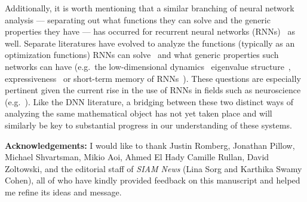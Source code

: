 \documentclass[11pt,lettersize]{article}
\begin{document}
Additionally, it is worth mentioning that a similar branching of neural network analysis --- separating out what functions they can solve and the generic properties they have --- has occurred for recurrent neural networks (RNNs)~\cite{hopfield1982neural} as well. Separate literatures have evolved to analyze the functions (typically as an optimization functions) RNNs can solve~\cite{rozell2008sparse,hu2012network,charles2012common} and what generic properties such networks can have (e.g.\ the low-dimensional dynamics~\cite{sussillo2013opening,rivkind2017local} eigenvalue structure~\cite{rajan2006eigenvalue}, expressiveness~\cite{khrulkov2017expressive} or short-term memory of RNNs~\cite{jaeger2001short,buonomano2009state,charles2014short,maass2002real,charles2017distributed}). These questions are especially pertinent given the current rise in the use of RNNs in fields such as neuroscience (e.g.~\cite{zhu2013visual,sussillo2015neural,depasquale2018full,rajan2016recurrent}). Like the DNN literature, a bridging between these two distinct ways of analyzing the same mathematical object has not yet taken place and will similarly be key to substantial progress in our understanding of these systems. 


\vspace{10pt}

{\bf Acknowledgements:} I would like to thank Justin Romberg, Jonathan Pillow, Michael Shvartsman, Mikio Aoi, Ahmed El Hady Camille Rullan, David Zoltowski, and the editorial staff of \emph{SIAM News} (Lina Sorg and Karthika Swamy Cohen), all of who have kindly provided feedback on this manuscript and helped me refine its ideas and message.




\end{document}
